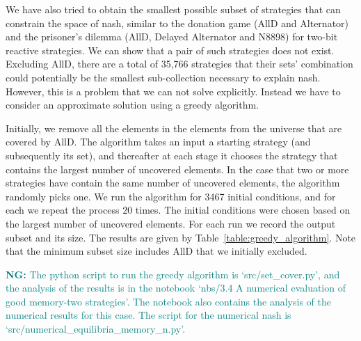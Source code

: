 \documentclass{article}
\theoremstyle{definition}
\newcommand{\nikoleta}[1]{\textcolor{teal}{{\bf NG:} #1}}
\begin{document}
We have also tried to obtain the smallest possible subset of strategies that can
constrain the space of nash, similar to the donation game (AllD and Alternator)
and the prisoner's dilemma (AllD, Delayed Alternator and N8898) for two-bit
reactive strategies. We can show that a pair of such strategies does not exist.
Excluding AllD, there are a total of 35,766 strategies that their sets'
combination could potentially  be the smallest sub-collection necessary to
explain nash. However, this is a problem that we can not solve explicitly.
Instead we have to consider an approximate solution using a greedy algorithm.

Initially, we remove all the elements in the elements from the universe that are
covered by AllD. The algorithm takes an input a starting strategy (and
subsequently its set), and thereafter at each stage it chooses the strategy that
contains the largest number of uncovered elements. In the case that two or more
strategies have contain the same number of uncovered elements, the algorithm
randomly picks one. We run the algorithm for 3467 initial conditions, and for
each we repeat the process 20 times. The initial conditions were chosen based on
the largest number of uncovered elements. For each run we record the output
subset and its size. The results are given by
Table~\ref{table:greedy_algorithm}. Note that the minimum subset size includes
AllD that we initially excluded.

\begin{table}[htbp]
  \centering
\caption{\textbf{Results of greedy algorithm.} The greedy algorithm was used to
find the smallest possible subset of pure memory-two strategies that can
constrain the space of nash in the case of memory-two strategies. Based on the
approximate solution, the smallest subset is of size
11.}\label{table:greedy_algorithm}
\end{table}

\nikoleta{The python script to run the greedy algorithm is `src/set\_cover.py',
and the analysis of the results is in the
notebook `nbs/3.4 A numerical evaluation of good memory-two strategies'.
The notebook also contains the analysis of the numerical results for this case.
The script for the numerical nash is `src/numerical\_equilibria\_memory\_n.py'.}
\end{document}
